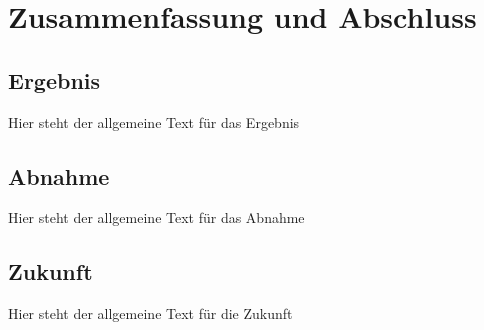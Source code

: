 \chapter{Zusammenfassung und Abschluss}

\section{Ergebnis}
Hier steht der allgemeine Text für das Ergebnis

\section{Abnahme}
Hier steht der allgemeine Text für das Abnahme

\section{Zukunft}
Hier steht der allgemeine Text für die Zukunft